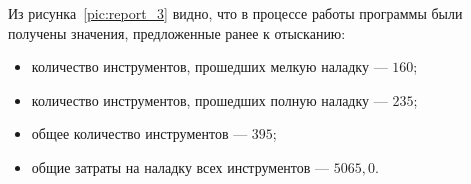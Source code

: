 Из рисунка~\ref{pic:report_3} видно, что в процессе работы программы были
получены значения, предложенные ранее к отысканию:

\begin{itemize}
  \item количество инструментов, прошедших мелкую наладку --- $ 160 $;
  \item количество инструментов, прошедших полную наладку --- $ 235 $;
  \item общее количество инструментов --- $ 395 $;
  \item общие затраты на наладку всех инструментов --- $ 5065{,}0 $.
\end{itemize}

\newpage
